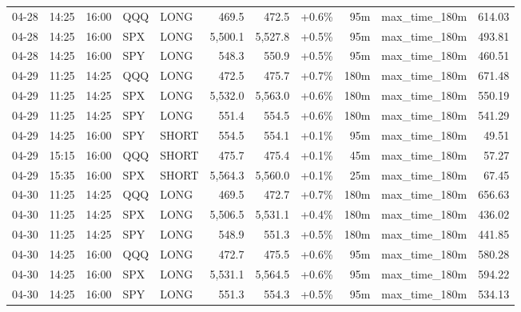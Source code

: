 \documentclass[11pt,a4paper,twoside]{article}
\begin{document}
\begin{center}
\begin{longtable}{>{\color{txtmain}}l l l l l r r r r >{\color{txtmain}}l r}
04-28 & 14:25 & 16:00 & QQQ & LONG & 469.5 & 472.5 & \textcolor{wingreen}{+0.6\%} & 95m & max\_time\_180m & \textcolor{wingreen}{614.03} \\
04-28 & 14:25 & 16:00 & SPX & LONG & 5,500.1 & 5,527.8 & \textcolor{wingreen}{+0.5\%} & 95m & max\_time\_180m & \textcolor{wingreen}{493.81} \\
04-28 & 14:25 & 16:00 & SPY & LONG & 548.3 & 550.9 & \textcolor{wingreen}{+0.5\%} & 95m & max\_time\_180m & \textcolor{wingreen}{460.51} \\
04-29 & 11:25 & 14:25 & QQQ & LONG & 472.5 & 475.7 & \textcolor{wingreen}{+0.7\%} & 180m & max\_time\_180m & \textcolor{wingreen}{671.48} \\
04-29 & 11:25 & 14:25 & SPX & LONG & 5,532.0 & 5,563.0 & \textcolor{wingreen}{+0.6\%} & 180m & max\_time\_180m & \textcolor{wingreen}{550.19} \\
04-29 & 11:25 & 14:25 & SPY & LONG & 551.4 & 554.5 & \textcolor{wingreen}{+0.6\%} & 180m & max\_time\_180m & \textcolor{wingreen}{541.29} \\
04-29 & 14:25 & 16:00 & SPY & SHORT & 554.5 & 554.1 & \textcolor{wingreen}{+0.1\%} & 95m & max\_time\_180m & \textcolor{wingreen}{49.51} \\
04-29 & 15:15 & 16:00 & QQQ & SHORT & 475.7 & 475.4 & \textcolor{wingreen}{+0.1\%} & 45m & max\_time\_180m & \textcolor{wingreen}{57.27} \\
04-29 & 15:35 & 16:00 & SPX & SHORT & 5,564.3 & 5,560.0 & \textcolor{wingreen}{+0.1\%} & 25m & max\_time\_180m & \textcolor{wingreen}{67.45} \\
04-30 & 11:25 & 14:25 & QQQ & LONG & 469.5 & 472.7 & \textcolor{wingreen}{+0.7\%} & 180m & max\_time\_180m & \textcolor{wingreen}{656.63} \\
04-30 & 11:25 & 14:25 & SPX & LONG & 5,506.5 & 5,531.1 & \textcolor{wingreen}{+0.4\%} & 180m & max\_time\_180m & \textcolor{wingreen}{436.02} \\
04-30 & 11:25 & 14:25 & SPY & LONG & 548.9 & 551.3 & \textcolor{wingreen}{+0.5\%} & 180m & max\_time\_180m & \textcolor{wingreen}{441.85} \\
04-30 & 14:25 & 16:00 & QQQ & LONG & 472.7 & 475.5 & \textcolor{wingreen}{+0.6\%} & 95m & max\_time\_180m & \textcolor{wingreen}{580.28} \\
04-30 & 14:25 & 16:00 & SPX & LONG & 5,531.1 & 5,564.5 & \textcolor{wingreen}{+0.6\%} & 95m & max\_time\_180m & \textcolor{wingreen}{594.22} \\
04-30 & 14:25 & 16:00 & SPY & LONG & 551.3 & 554.3 & \textcolor{wingreen}{+0.5\%} & 95m & max\_time\_180m & \textcolor{wingreen}{534.13} \\

\end{longtable}
\end{center}
\end{document}
